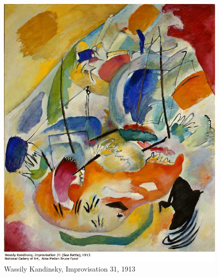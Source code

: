 \begin{figure}[h]
	\centering
	\includegraphics[width=12cm]{inspire/Improv31.jpg}
	\caption{Wassily Kandinsky, Improvisation 31, 1913}
	\label{fig:KandinskyImprov31}
\end{figure}



